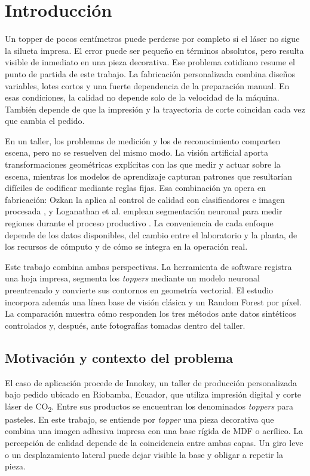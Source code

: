 \chapter{Introducción}
\label{cap:introduccion}

Un topper de pocos centímetros puede perderse por completo si el láser no sigue la silueta impresa. El error puede ser pequeño en términos absolutos, pero resulta visible de inmediato en una pieza decorativa. Ese problema cotidiano resume el punto de partida de este trabajo. La fabricación personalizada combina diseños variables, lotes cortos y una fuerte dependencia de la preparación manual. En esas condiciones, la calidad no depende solo de la velocidad de la máquina. También depende de que la impresión y la trayectoria de corte coincidan cada vez que cambia el pedido.

En un taller, los problemas de medición y los de reconocimiento comparten escena, pero no se resuelven del mismo modo. La visión artificial aporta transformaciones geométricas explícitas con las que medir y actuar sobre la escena, mientras los modelos de aprendizaje capturan patrones que resultarían difíciles de codificar mediante reglas fijas. Esa combinación ya opera en fabricación: Ozkan la aplica al control de calidad con clasificadores e imagen procesada \cite{Ozkan2025}, y Loganathan et al. emplean segmentación neuronal para medir regiones durante el proceso productivo \cite{Loganathan2026}. La conveniencia de cada enfoque depende de los datos disponibles, del cambio entre el laboratorio y la planta, de los recursos de cómputo y de cómo se integra en la operación real.

Este trabajo combina ambas perspectivas. La herramienta de software registra una hoja impresa, segmenta los \textit{toppers} mediante un modelo neuronal preentrenado y convierte sus contornos en geometría vectorial. El estudio incorpora además una línea base de visión clásica y un Random Forest por píxel. La comparación muestra cómo responden los tres métodos ante datos sintéticos controlados y, después, ante fotografías tomadas dentro del taller.

\section{Motivación y contexto del problema}

El caso de aplicación procede de Innokey, un taller de producción personalizada bajo pedido ubicado en Riobamba, Ecuador, que utiliza impresión digital y corte láser de CO\textsubscript{2}. Entre sus productos se encuentran los denominados \textit{toppers} para pasteles. En este trabajo, se entiende por \textit{topper} una pieza decorativa que combina una imagen adhesiva impresa con una base rígida de MDF o acrílico. La percepción de calidad depende de la coincidencia entre ambas capas. Un giro leve o un desplazamiento lateral puede dejar visible la base y obligar a repetir la pieza.

